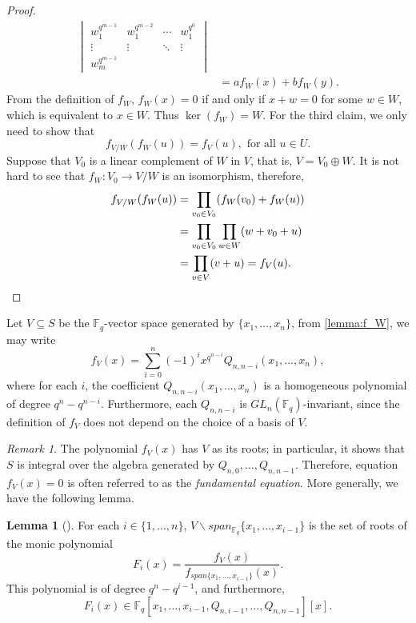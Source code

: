 \documentclass[12pt,a4paper]{report}
\theoremstyle{definition}
\newtheorem{lemma}[theorem]{Lemma}
\theoremstyle{remark}
\newtheorem*{remark}{Remark}
\theoremstyle{definition}
\begin{document}
\begin{proof}
\begin{align*}
{\begin{vmatrix}
        w_1^{q^{m-1}} & w_1^{q^{m-2}} & \cdots & w_1^{q^0}\\
        \vdots & \vdots & \ddots  & \vdots\\
        w_m^{q^{m-1}}
        \end{vmatrix}}\\
        &= af_W(x) + bf_W(y).
    \end{align*}
    From the definition of $f_W$, $f_W(x) = 0$ if and only if $x+w=0$ for some $w\in W$, which is equivalent to $x\in W$. Thus $\ker(f_W) = W$.\smallbreak
    For the third claim, we only need to show that
    \begin{equation}\label{eq:quotient_f}
        f_{V/W}(f_W(u)) = f_V(u), \text{ for all } u\in U.
    \end{equation}
    Suppose that $V_0$ is a linear complement of $W$ in $V$, that is, $V = V_0 \oplus W$. It is not hard to see that $f_W: V_0\to V/W$ is an isomorphism, therefore,
    \begin{align*}
        f_{V/W}(f_W(u)) &= \prod\limits_{v_0\in V_0}(f_W(v_0)+f_W(u)) \\ 
        &=\prod\limits_{v_0\in V_0}\prod\limits_{w\in W}(w + v_0+u) \\
        &=\prod\limits_{v\in V}(v+u) = f_V(u).\qedhere
    \end{align*}
\end{proof}
Let $V\subseteq S$ be the $\mathbb{F}_q$-vector space generated by $\{x_1, \ldots, x_n\}$, from \cref{lemma:f_W}, we may write
\begin{equation*}
    f_V(x) = \sum\limits_{i=0}^{n}(-1)^i x^{q^{n-i}}Q_{n, n-i}(x_1, \ldots, x_n),
\end{equation*}
where for each $i$, the coefficient $Q_{n, n-i}(x_1, \ldots, x_n)$ is a homogeneous polynomial of degree $q^n - q^{n-i}$. Furthermore, each $Q_{n, n-i}$ is $GL_n(\mathbb{F}_q)$-invariant, since the definition of $f_V$ does not depend on the choice of a basis of $V$.
\begin{remark}
    The polynomial $f_V(x)$ has $V$ as its roots; in particular, it shows that $S$ is integral over the algebra generated by $Q_{n, 0}, \ldots, Q_{n, n-1}$. Therefore, equation $f_V(x)=0$ is often referred to as the \emph{fundamental equation}. More generally, we have the following lemma.
\end{remark}
\begin{lemma}[{\cite[Lemma 2]{steinberg_dicksons_1987}}]\label{lemma:showing_polynomial_of_the_right_deg}
    For each $i\in \{1, \ldots, n\}$, $V\backslash span_{\mathbb{F}_q}\{x_1, \ldots, x_{i-1}\}$ is the set of roots of the monic polynomial 
    \begin{equation*}
        F_i(x) = \dfrac{f_V(x)}{f_{span\{x_1, \ldots, x_{i-1}\}}(x)}.
    \end{equation*}
    This polynomial is of degree $q^n - q^{i-1}$, and furthermore, 
    \begin{equation*}
        F_i(x) \in\mathbb{F}_q[x_1, \ldots, x_{i-1}, Q_{n, i-1}, \ldots, Q_{n, n-1}][x].
    \end{equation*}
    \end{lemma}
\end{document}
